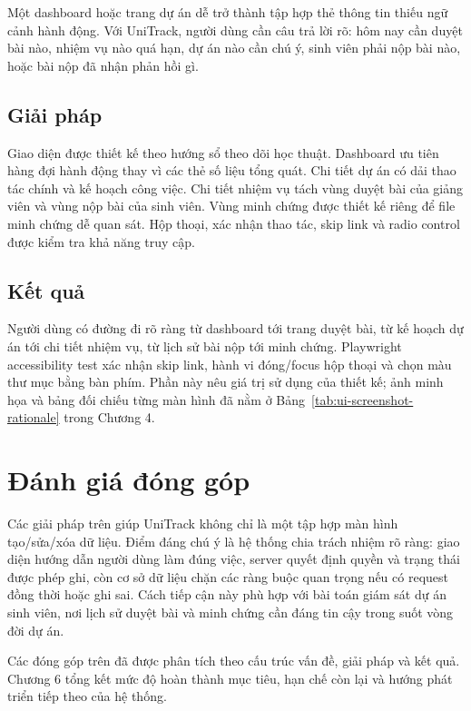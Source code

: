 Một dashboard hoặc trang dự án dễ trở thành tập hợp thẻ thông tin thiếu ngữ cảnh hành động. Với UniTrack, người dùng cần câu trả lời rõ: hôm nay cần duyệt bài nào, nhiệm vụ nào quá hạn, dự án nào cần chú ý, sinh viên phải nộp bài nào, hoặc bài nộp đã nhận phản hồi gì.

\subsection{Giải pháp}

Giao diện được thiết kế theo hướng sổ theo dõi học thuật. Dashboard ưu tiên hàng đợi hành động thay vì các thẻ số liệu tổng quát. Chi tiết dự án có dải thao tác chính và kế hoạch công việc. Chi tiết nhiệm vụ tách vùng duyệt bài của giảng viên và vùng nộp bài của sinh viên. Vùng minh chứng được thiết kế riêng để file minh chứng dễ quan sát. Hộp thoại, xác nhận thao tác, skip link và radio control được kiểm tra khả năng truy cập.

\subsection{Kết quả}

Người dùng có đường đi rõ ràng từ dashboard tới trang duyệt bài, từ kế hoạch dự án tới chi tiết nhiệm vụ, từ lịch sử bài nộp tới minh chứng. Playwright accessibility test xác nhận skip link, hành vi đóng/focus hộp thoại và chọn màu thư mục bằng bàn phím. Phần này nêu giá trị sử dụng của thiết kế; ảnh minh họa và bảng đối chiếu từng màn hình đã nằm ở Bảng~\ref{tab:ui-screenshot-rationale} trong Chương 4.

\section{Đánh giá đóng góp}

Các giải pháp trên giúp UniTrack không chỉ là một tập hợp màn hình tạo/sửa/xóa dữ liệu. Điểm đáng chú ý là hệ thống chia trách nhiệm rõ ràng: giao diện hướng dẫn người dùng làm đúng việc, server quyết định quyền và trạng thái được phép ghi, còn cơ sở dữ liệu chặn các ràng buộc quan trọng nếu có request đồng thời hoặc ghi sai. Cách tiếp cận này phù hợp với bài toán giám sát dự án sinh viên, nơi lịch sử duyệt bài và minh chứng cần đáng tin cậy trong suốt vòng đời dự án.

Các đóng góp trên đã được phân tích theo cấu trúc vấn đề, giải pháp và kết quả. Chương 6 tổng kết mức độ hoàn thành mục tiêu, hạn chế còn lại và hướng phát triển tiếp theo của hệ thống.
